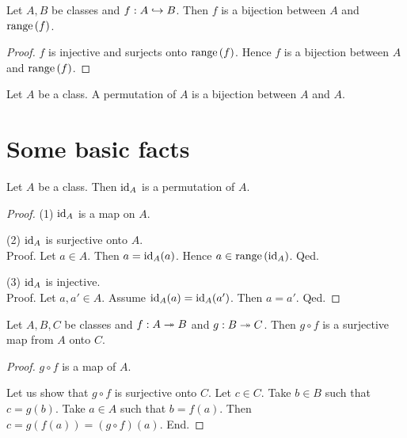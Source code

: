 \documentclass[../../set-theory/set-theory.tex]{subfiles}
\begin{document}
  \begin{forthel}
    \begin{proposition}
      Let $A, B$ be classes and $f : A \hookrightarrow B$.
      Then $f$ is a bijection between $A$ and $\mathrm{range}\left(f\right)$.
    \end{proposition}
    \begin{proof}
      $f$ is injective and surjects onto $\mathrm{range}\left(f\right)$.
      Hence $f$ is a bijection between $A$ and $\mathrm{range}\left(f\right)$.
    \end{proof}
  \end{forthel}

  \begin{forthel}
    \begin{definition}
      Let $A$ be a class.
      A permutation of $A$ is a bijection between $A$ and $A$.
    \end{definition}
  \end{forthel}


  \section{Some basic facts}

  \begin{forthel}
    \begin{proposition}
      Let $A$ be a class.
      Then $\mathrm{id}_{A}$ is a permutation of $A$.
    \end{proposition}
    \begin{proof}
      (1) $\mathrm{id}_{A}$ is a map on $A$.

      (2) $\mathrm{id}_{A}$ is surjective onto $A$. \\
      Proof.
        Let $a \in A$.
        Then $a = \mathrm{id}_{A}(a)$.
        Hence $a \in \mathrm{range}\left(\mathrm{id}_{A}\right)$.
      Qed.

      (3) $\mathrm{id}_{A}$ is injective. \\
      Proof.
        Let $a, a' \in A$.
        Assume $\mathrm{id}_{A}(a) = \mathrm{id}_{A}(a')$.
        Then $a = a'$.
      Qed.
    \end{proof}
  \end{forthel}

  \begin{forthel}
    \begin{proposition}
      Let $A, B, C$ be classes and $f : A \twoheadrightarrow B$ and $g : B \twoheadrightarrow C$.
      Then $g \circ f$ is a surjective map from $A$ onto $C$.
    \end{proposition}
    \begin{proof}
      $g \circ f$ is a map of $A$.

      Let us show that $g \circ f$ is surjective onto $C$.
        Let $c \in C$.
        Take $b \in B$ such that $c = g(b)$.
        Take $a \in A$ such that $b = f(a)$.
        Then $c = g(f(a)) = (g \circ f)(a)$.
      End.
    \end{proof}
  \end{forthel}
\end{document}
